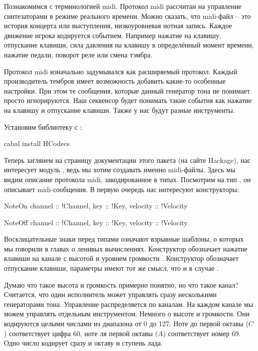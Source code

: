 Познакомимся с терминологией midi. Протокол 
midi рассчитан на управление синтезаторами в 
режиме реального времени. Можно сказать, что
midi-файл -- это история концерта или выступления,
низкоуровневая нотная запись. Каждое движение
игрока кодируется событием. Например нажатие
на клавишу, отпускание клавиши, сила давления
на клавишу в определённый момент времени,
нажатие педали, поворот реле или смена тэмбра.

Протокол midi изначально задумывался как расширяемый
протокол. Каждый производитель тембров имеет возможность
добавить какие-то особенные настройки. При этом
те сообщения, которые данный генератор тона не понимает
просто игнорируются. Наш секвенсор будет 
понимать такие события как нажатие на клавишу и 
отпускание клавиши. Также у нас будут разные 
инструменты. 

Установим библиотеку  с :

\begin{code}
cabal install HCodecs
\end{code}

Теперь заглянем на страницу документации этого пакета
(на сайте Hackage), нас интересует модуль , ведь мы хотим 
создавать именно midi-файлы. Здесь мы видим описание
протокола midi, закодированное в типах. 
Посмотрим на тип , он описывает midi-сообщения.
В первую очередь нас интересуют конструкторы:

\begin{code}
NoteOn {
    channel  :: !Channel,
    key      :: !Key,
    velocity :: !Velocity }

NoteOff	{
    channel  :: !Channel,
    key      :: !Key,
    velocity :: !Velocity }
\end{code}

Восклицательные знаки перед типами означают взрывные
шаблоны, о которых мы говорили в главах о ленивых вычислениях.
Конструктор  обозначает нажатие клавиши на
канале  с высотой  и уровнем громкости
. Конструктор  обозначает отпускание
клавиши, параметры имеют тот же смысл, что и в случае . 

Думаю что такое высота и громкость примерно понятно, но что
такое канал? Считается, что один исполнитель может управлять 
сразу несколькими генераторами тона. Управление распределяется 
по каналам. На каждом канале мы можем управлять отдельным
инструментом. Немного о высоте и громкости. Они кодируются
целыми числами из диапазона от 0 до 127. Ноте до первой октавы ($C$)
соответствует цифра 60, ноте ля первой октавы ($A$) соответствует
номер 69. Одно число кодирует сразу и октаву и ступень лада.

